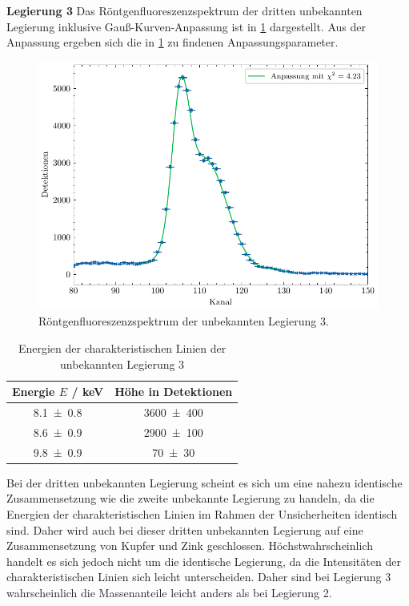 \noindent\textbf{Legierung 3}\newline
Das Röntgenfluoreszenzspektrum der dritten unbekannten Legierung inklusive Gauß-Kurven-Anpassung ist in \cref{fig:unbekannt3} dargestellt. Aus der Anpassung ergeben sich die
in \cref{tab:unbekannt3} zu findenen Anpassungsparameter.
\begin{figure}[H]
	\centering
	\includegraphics[width=0.6\linewidth]{../figs/Unbekannt3.pdf}
	\caption{Röntgenfluoreszenzspektrum der unbekannten Legierung 3.}
	\label{fig:unbekannt3}
\end{figure}
\begin{table}[H]
    \centering
    \caption{Energien der charakteristischen Linien der unbekannten Legierung 3}
    \label{tab:unbekannt3}
    \begin{tabular}{c|c}
       Energie $E$ / \unit{\kilo\electronvolt} & Höhe in Detektionen \\
\hline
\num{8.1\pm 0.8} & \num{3600\pm 400} \\ 
\num{8.6\pm 0.9} & \num{2900\pm 100} \\ 
\num{9.8\pm 0.9} & \num{70\pm 30} \\ 

    \end{tabular}
\end{table} Bei der dritten unbekannten Legierung scheint es sich um eine nahezu identische Zusammensetzung wie die zweite unbekannte Legierung zu handeln,
da die Energien der charakteristischen Linien im Rahmen der Unsicherheiten identisch sind. Daher wird auch bei dieser dritten unbekannten Legierung
auf eine Zusammensetzung von Kupfer und Zink geschlossen. Höchstwahrscheinlich handelt es sich jedoch nicht um die identische Legierung, da die Intensitäten
der charakteristischen Linien sich leicht unterscheiden. Daher sind bei Legierung 3 wahrscheinlich die Massenanteile leicht anders als bei Legierung 2.\\

